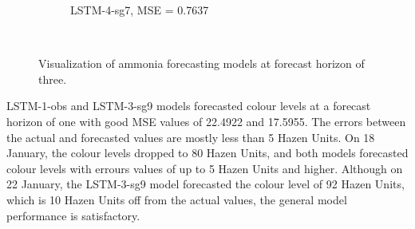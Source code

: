 \begin{figure}[!ht]
\begin{subfigure}[t]{0.75\textwidth}
    \caption{LSTM-4-sg7, MSE = 0.7637} \label{fig:nh3-lstm-4-fc3}
  \end{subfigure}\\
\caption{Visualization of ammonia forecasting models at forecast horizon of three.} \label{fig:nh3-forecast-fc3}
\end{figure}

LSTM-1-obs and LSTM-3-sg9 models forecasted colour levels at a forecast horizon of one with good MSE values of 22.4922 and 17.5955. The errors between the actual and forecasted values are mostly less than 5 Hazen Units. On 18 January, the colour levels dropped to 80 Hazen Units, and both models forecasted colour levels with errours values of up to 5 Hazen Units and higher. Although on 22 January, the LSTM-3-sg9 model forecasted the colour level of 92 Hazen Units, which is 10 Hazen Units off from the actual values, the general model performance is satisfactory. 

